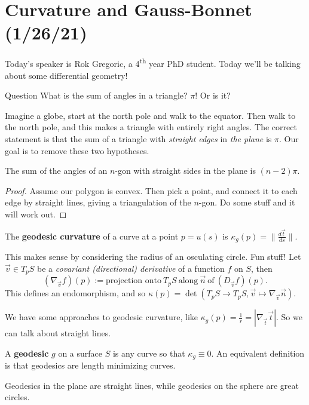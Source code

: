 \section{Curvature and Gauss-Bonnet (1/26/21)}
Today's speaker is Rok Gregoric, a 4\textsuperscript{th} year PhD student. Today we'll be talking about some differential geometry!

\begin{namedthing}{Question}
   What is the sum of angles in a triangle? $\pi$! Or is it?
\end{namedthing}
Imagine a globe, start at the north pole and walk to the equator. Then walk to the north pole, and this makes a triangle with entirely right angles. The correct statement is that the sum of a triangle with \emph{straight edges} in \emph{the plane} is $\pi$. Our goal is to remove these two hypotheses.

\begin{cor}
    The sum of the angles of an $n$-gon with straight sides in the plane is $(n-2)\pi$.
\end{cor}
\begin{proof}
    Assume our polygon is convex. Then pick a point, and connect it to each edge by straight lines, giving a triangulation of the $n$-gon. Do some stuff and it will work out.
\end{proof}
\begin{definition}[]
    The \textbf{geodesic curvature} of a curve at a point $p=u(s)$ is $\kappa_g(p)= \| \frac{d\vec t}{ds}\|.$
\end{definition}
This makes sense by considering the radius of an osculating circle. Fun stuff! Let $\vec v \in  T_p S$ be a \emph{covariant (directional) derivative} of a function $f$ on $S$, then \[
    \left( \nabla _{\vec v}f \right) (p) := \text{projection onto} \ T_p S  \ \text{along} \ \vec n \ \text{of} \ (D_{\vec v}f)(p).
\] This defines an endomorphism, and so $\kappa(p)=\det \left( T_p S \to T_pS, \vec v \mapsto \nabla _{\vec v}\vec n \right) $.

We have some approaches to geodesic curvature, like $\kappa_g(p)=\frac{1}{r}= | \nabla _{\vec t}\vec t|$. So we can talk about straight lines.
\begin{definition}[]
    A \textbf{geodesic} $g$ on a surface $S$ is any curve so that $\kappa_g\equiv 0$. An equivalent definition is that geodesics are length minimizing curves.
\end{definition}
\begin{example}
    Geodesics in the plane are straight lines, while geodesics on the sphere are great circles.
\end{example}

